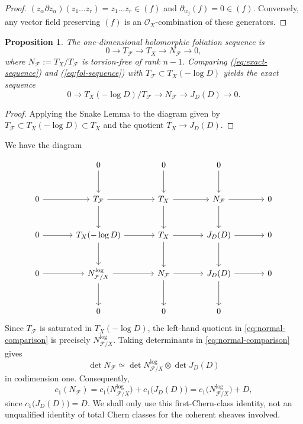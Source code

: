 \documentclass[12pt,reqno,a4paper]{amsart}
\numberwithin{equation}{section}
\theoremstyle{plain}
\newtheorem{proposition}[proposition]{Proposition}
\theoremstyle{definition}
\newcommand{\cO}{\mathcal{O}}
\newcommand{\cF}{\mathcal{F}}
\begin{document}
\begin{proof}
$(z_{\alpha} \partial{z_{\alpha}})(z_1 \ldots z_r) = z_1 \ldots z_r \in (f)$ and $\partial_{w_j}(f)=0 \in (f).$ Conversely, any vector field preserving $(f)$ is an $\cO_X$-combination of these generators.    
\end{proof}

\begin{proposition}  
The one-dimensional holomorphic foliation sequence is
\begin{equation} \label{eq:fol-sequence}
0 \to T_{\cF} \to T_X \to N_{\cF} \to 0,
\end{equation}
where $N_{\cF}:=T_X/T_{\cF}$ is torsion-free of rank $n-1.$ Comparing (\ref{eq:exact-sequence}) and (\ref{eq:fol-sequence}) with $T_{\cF} \subset T_X(-\log D)$ yields the exact sequence 
\begin{equation} \label{eq:normal-comparison}
0 \to T_X(- \log D)/T_{\cF} \to N_{\cF} \to J_D(D) \to 0.
\end{equation}
\end{proposition}

\begin{proof}
Applying the Snake Lemma to the diagram given by $T_{\cF} \subset T_X(- \log D) \subset T_X$ and the quotient $T_X \to J_D(D).$ 
\end{proof}



We have the   diagram

 \[
\begin{tikzcd}[row sep=large, column sep=large]
& 0 \arrow[d] & 0 \arrow[d] & 0 \arrow[d] & \\
0 \arrow[r] &
T_{\cF} \arrow[r] \arrow[d] &
T_X \arrow[r] \arrow[d] &
N_{\cF} \arrow[r] \arrow[d] &
0 \\
0 \arrow[r] &
T_X(-\log D) \arrow[r] \arrow[d] &
T_X \arrow[r] \arrow[d] &
J_D(D) \arrow[r] \arrow[d] &
0 \\
0 \arrow[r] &
N_{\cF/X}^{\log} \arrow[r] \arrow[d] &
N_{\cF} \arrow[r] \arrow[d] &
J_D(D) \arrow[r] \arrow[d] &
0 \\
& 0 & 0 & 0 &
\end{tikzcd}
\]
Since \(T_{\cF}\) is saturated in \(T_X(-\log D)\), the left-hand quotient in
\eqref{eq:normal-comparison} is precisely \(N^{\log}_{\cF/X}\). Taking determinants
in \eqref{eq:normal-comparison} gives
\[
\det N_{\cF}
\simeq
\det N^{\log}_{\cF/X}\otimes \det J_D(D)
\]
in codimension one. Consequently,
\[
c_1(N_{\cF})
=
c_1\bigl(N^{\log}_{\cF/X}\bigr)
+
c_1\bigl(J_D(D)\bigr)
=
c_1\bigl(N^{\log}_{\cF/X}\bigr)+D,
\]
since \(c_1\bigl(J_D(D)\bigr)=D\). We shall only use this first-Chern-class
identity, not an unqualified identity of total Chern classes for the coherent
sheaves involved.
\end{document}
